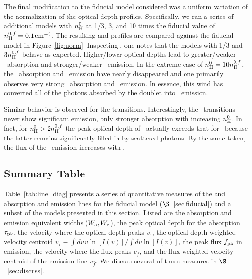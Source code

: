 \documentclass[]{emulateapj}
\begin{document}
The final modification to the fiducial model considered was %
a uniform variation of
the normalization of the optical depth profiles.
Specifically, we ran a series of additional models with $n_{\rm H}^0$ at
1/3, 3, and 10 times the fiducial value of $n_{\rm H}^{0,f} = 0.1 \, {\rm cm^{-3}}$.
The resulting  and  profiles are compared
against the fiducial model in Figure~\ref{fig:norm}.  Inspecting
, one notes that the models with 1/3 and $3 n_{\rm H}^{0,f}$
behave as expected.  Higher/lower optical depths lead to
greater/weaker \mgiia\ absorption and stronger/weaker \mgiib\ emission.
In the extreme case of
$n_{\rm H}^0 = 10 n_{\rm H}^{0,f}$, the \mgiib\ absorption and \mgiia\
emission have nearly disappeared and one primarily observes very
strong \mgiia\ absorption and \mgiib\ emission.
In essence, this wind has converted all of the photons absorbed by the
\ion{Mg}{2} doublet into \mgiib\ emission.

Similar behavior is observed for the  transitions.
Interestingly, the \feiia\ transitions never show significant emission,
only stronger absorption with increasing $n_{\rm H}^0$.  In fact, for $n_{\rm H}^0
> 2 n_{\rm H}^{0,f}$ the peak optical depth of \feiia\ actually exceeds that
for \feiib\ because the latter remains significantly filled-in by
scattered photons.  By the same token, the flux of the \feiic\
emission increases with \nhn.

\subsection{Summary Table}

Table~\ref{tab:line_diag} presents a series of quantitative measures
of the  and  absorption and emission lines for
the fiducial model ($\S$~\ref{sec:fiducial}) and a subset of the models
presented in this section.  Listed are the absorption and emission
equivalent widths ($W_{\rm a}, W_{\rm e}$), the peak optical depth
for the absorption $\tau_{\rm pk}$, the
velocity where the optical depth peaks $v_\tau$, the optical
depth-weighted velocity centroid $v_{\bar \tau} \equiv \int dv \, v
\ln[I(v)] / \int dv \ln[I(v)]$, the peak flux $f_{\rm pk}$ in
emission, the velocity where the flux peaks $v_f$, and the
flux-weighted velocity centroid of the emission line $v_{\bar f}$.
We discuss several of these measures in $\S$~\ref{sec:discuss}.



\end{document}
